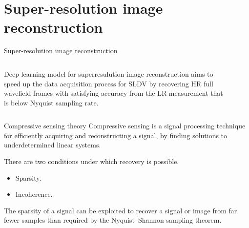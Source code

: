 \documentclass[10pt,aspectratio=169,dvipsnames]{beamer} %
\begin{document}
	\section{Super-resolution image reconstruction}
	\begin{frame}{Super-resolution image reconstruction}
		\begin{columns}[T]
			\begin{column}[c]{0.35\textwidth}
				\justifying	
				\small	
				Deep learning model for superresulution image reconstruction aims to speed up the data acquisition process for SLDV by recovering HR full wavefield frames with satisfying accuracy from the LR measurement that is below Nyquist sampling rate.				
			\end{column}
			\begin{column}[c]{0.6\textwidth}
				\begin{figure}
				\end{figure}
			\end{column}
		\end{columns}
	\end{frame}
	\setcounter{subfigure}{0}
	\begin{frame}{Compressive sensing theory}
		Compressive sensing is a signal processing technique for efficiently acquiring and reconstructing a signal, by finding solutions to underdetermined linear systems. 
				
		There are two conditions under which recovery is possible.
		\begin{itemize}
			\item Sparsity.
			\item Incoherence.
		\end{itemize}
		
		The sparsity of a signal can be exploited to recover a signal or image from far fewer samples than required by the Nyquist–Shannon sampling theorem. 
		
	\end{frame}
\end{document}
